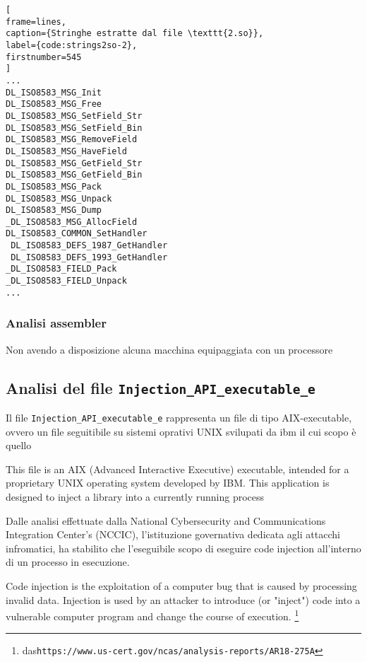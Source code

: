 \documentclass[10pt,a4paper, titlepage]{report}
\begin{document}
\begin{lstlisting}[
frame=lines, 
caption={Stringhe estratte dal file \texttt{2.so}}, 
label={code:strings2so-2},
firstnumber=545
]
...
DL_ISO8583_MSG_Init
DL_ISO8583_MSG_Free
DL_ISO8583_MSG_SetField_Str
DL_ISO8583_MSG_SetField_Bin
DL_ISO8583_MSG_RemoveField
DL_ISO8583_MSG_HaveField
DL_ISO8583_MSG_GetField_Str
DL_ISO8583_MSG_GetField_Bin
DL_ISO8583_MSG_Pack
DL_ISO8583_MSG_Unpack
DL_ISO8583_MSG_Dump
_DL_ISO8583_MSG_AllocField
DL_ISO8583_COMMON_SetHandler
 DL_ISO8583_DEFS_1987_GetHandler
 DL_ISO8583_DEFS_1993_GetHandler
_DL_ISO8583_FIELD_Pack
_DL_ISO8583_FIELD_Unpack
...
\end{lstlisting}

\subsubsection{Analisi assembler}

Non avendo a disposizione alcuna macchina equipaggiata con un processore 



\newpage

\subsection{Analisi del file \texttt{Injection\_API\_executable\_e}}

Il file \texttt{Injection\_API\_executable\_e} rappresenta un file di tipo AIX-executable, ovvero un file seguitibile su sistemi oprativi UNIX svilupati da ibm il cui scopo è quello 

This file is an AIX (Advanced Interactive Executive) executable, intended for a proprietary UNIX operating system developed by IBM. This application is designed to inject a library into a currently running process

Dalle analisi effettuate dalla National Cybersecurity and Communications Integration Center’s (NCCIC), l'istituzione governativa dedicata agli attacchi infromatici, ha stabilito che l'eseguibile scopo di eseguire code injection all'interno di un processo in esecuzione. 

Code injection is the exploitation of a computer bug that is caused by processing invalid data. Injection is used by an attacker to introduce (or "inject") code into a vulnerable computer program and change the course of execution. \footnote{das\texttt{https://www.us-cert.gov/ncas/analysis-reports/AR18-275A}}
\end{document}
